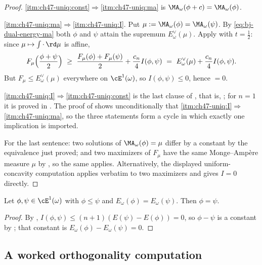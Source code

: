\begin{proof}
\cref{itm:ch47-uniq:const}$\Rightarrow$\cref{itm:ch47-uniq:ma} is
$\MA_\omega(\phi+c)=\MA_\omega(\phi)$.

\cref{itm:ch47-uniq:ma}$\Rightarrow$\cref{itm:ch47-uniq:I}.  Put
$\mu:=\MA_\omega(\phi)=\MA_\omega(\psi)$.  By
\eqref{eq:bj-dual-energy-ma} both $\phi$ and $\psi$ attain the
supremum $E^\vee_\omega(\mu)$.  Apply 
with $t=\tfrac12$: since $\mu\mapsto\int\cdot\,\rd\mu$ is affine,
\[
 F_\mu\Bigl(\frac{\phi+\psi}{2}\Bigr)
 \ \ge\ \frac{F_\mu(\phi)+F_\mu(\psi)}{2}
        +\frac{c_n}{4}I(\phi,\psi)
 \ =\ E^\vee_\omega(\mu)+\frac{c_n}{4}I(\phi,\psi).
\]
But $F_\mu\le E^\vee_\omega(\mu)$ everywhere on $\cE^1(\omega)$, so
$I(\phi,\psi)\le0$, hence $=0$.

\cref{itm:ch47-uniq:I}$\Rightarrow$\cref{itm:ch47-uniq:const} is the last
clause of , that is,
\cite[Corollary~10.4]{BJ22}; for $n=1$ it is proved in
.  The proof of
 shows unconditionally that
\cref{itm:ch47-uniq:I}$\Rightarrow$\cref{itm:ch47-uniq:ma}, so the three
statements form a cycle in which exactly one implication is imported.

For the last sentence: two solutions of $\MA_\omega(\phi)=\mu$ differ by
a constant by the equivalence just proved; and two maximizers of $F_\mu$
have the same Monge--Amp\`ere measure $\mu$ by
, so the same applies.  Alternatively, the
displayed uniform-concavity computation applies verbatim to two maximizers
and gives $I=0$ directly.
\end{proof}

\begin{corollary}
\label{cor:ch47-strict-monotone}
Let $\phi,\psi\in\cE^1(\omega)$ with $\phi\le\psi$ and
$E_\omega(\phi)=E_\omega(\psi)$.  Then $\phi=\psi$.
\end{corollary}

\begin{proof}
By , $I(\phi,\psi)\le(n+1)(E(\psi)-E(\phi))=0$,
so $\phi-\psi$ is a constant by ; that constant
is $E_\omega(\phi)-E_\omega(\psi)=0$.
\end{proof}

\subsection{A worked orthogonality computation}
\label{sec:ch47-orthogonality-example}

